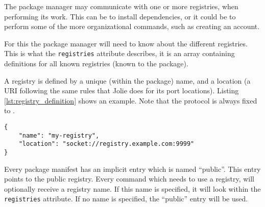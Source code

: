 The package manager may communicate with one or more registries, when
performing its work. This can be to install dependencies, or it could be to
perform some of the more organizational commands, such as creating an account.

For this the package manager will need to know about the different registries.
This is what the \texttt{registries} attribute describes, it is an
array containing definitions for all known registries (known to the package).

A registry is defined by a unique (within the package) name, and a location (a
        URI following the same rules that Jolie does for its port locations).
Listing \ref{lst:registry_definition} shows an example. Note that the protocol
is always fixed to .

\begin{listing}[H]

\begin{verbatim}
{
    "name": "my-registry",
    "location": "socket://registry.example.com:9999"
}
\end{verbatim}

\caption{A registry named \texttt{my-registry} being hosted at
    \texttt{registry.example.com} running on port 9999}

\label{lst:registry_definition}

\end{listing}

Every package manifest has an implicit entry which is named ``public''. This
entry points to the public registry. Every command which needs to use a
registry, will optionally receive a registry name. If this name is specified,
it will look within the \texttt{registries} attribute. If no name is
specified, the ``public'' entry will be used.
